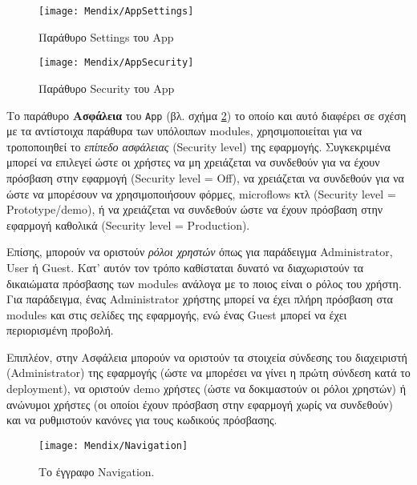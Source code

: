             \begin{figure}[h!] \noindent \centering
                \texttt{[image: Mendix/AppSettings]}
                \caption{\centering Παράθυρο Settings του App}
                \label{fig:MendixAppSettings}
            \end{figure}

            \begin{figure}[h!] \noindent \centering
                \texttt{[image: Mendix/AppSecurity]}
                \caption{\centering Παράθυρο Security του App}
                \label{fig:MendixAppSecurity}
            \end{figure}

            Το παράθυρο \textbf{Ασφάλεια} του \texttt{App} (βλ. σχήμα \ref{fig:MendixAppSecurity}) το οποίο και αυτό διαφέρει σε σχέση με τα αντίστοιχα παράθυρα των υπόλοιπων modules, χρησιμοποιείται για να τροποποιηθεί το \textit{επίπεδο ασφάλειας} (Security level) της εφαρμογής. Συγκεκριμένα μπορεί να επιλεγεί ώστε οι χρήστες να μη χρειάζεται να συνδεθούν για να έχουν πρόσβαση στην εφαρμογή (Security level = Off), να χρειάζεται να συνδεθούν για να ώστε να μπορέσουν να χρησιμοποιήσουν φόρμες, microflows κτλ (Security level = Prototype/demo), ή να χρειάζεται να συνδεθούν ώστε να έχουν πρόσβαση στην εφαρμογή καθολικά (Security level = Production).

            Επίσης, μπορούν να οριστούν \textit{ρόλοι χρηστών} όπως για παράδειγμα Administrator, User ή Guest. Κατ' αυτόν τον τρόπο καθίσταται δυνατό να διαχωριστούν τα δικαιώματα πρόσβασης των modules ανάλογα με το ποιος είναι ο ρόλος του χρήστη. Για παράδειγμα, ένας Administrator χρήστης μπορεί να έχει πλήρη πρόσβαση στα modules και στις σελίδες της εφαρμογής, ενώ ένας Guest μπορεί να έχει περιορισμένη προβολή.

            Επιπλέον, στην Ασφάλεια μπορούν να οριστούν τα στοιχεία σύνδεσης του διαχειριστή (Administrator) της εφαρμογής (ώστε να μπορέσει να γίνει η πρώτη σύνδεση κατά το deployment), να οριστούν demo χρήστες (ώστε να δοκιμαστούν οι ρόλοι χρηστών) ή ανώνυμοι χρήστες (οι οποίοι έχουν πρόσβαση στην εφαρμογή χωρίς να συνδεθούν) και να ρυθμιστούν κανόνες για τους κωδικούς πρόσβασης.

            \begin{figure}[h!] \noindent \centering
                \texttt{[image: Mendix/Navigation]}
                \caption{\centering Το έγγραφο Navigation.}
                \label{fig:MendixAppNavigation}
            \end{figure}

